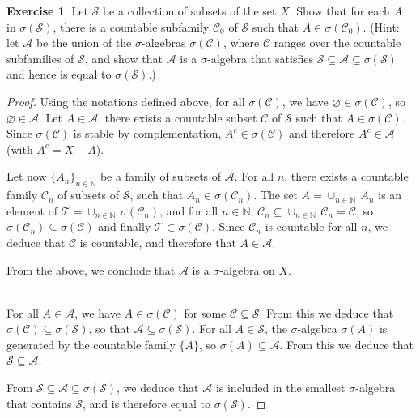 \documentclass[11pt,a4paper,twoside]{article}
\theoremstyle{definition}
\newcounter{excounter}
\newtheorem{exercise}[excounter]{Exercise}
\begin{document}
\begin{exercise}

  Let $\mathscr{S}$ be a collection of subsets of the set $X$. Show that for each $A$ in $\sigma ( \mathscr{S} )$,
  there is a countable subfamily $\mathscr{C}_0$ of $\mathscr{S}$ such that $A \in \sigma ( \mathscr{C}_0 )$. (Hint:
  let $\mathscr{A}$ be the union of the $\sigma$-algebras $\sigma ( \mathscr{C} )$, where $\mathscr{C}$ ranges over
  the countable subfamilies of $\mathscr{S}$, and show that $\mathscr{A}$ is a $\sigma$-algebra that satisfies
  $\mathscr{S} \subseteq \mathscr{A} \subseteq \sigma ( \mathscr{S} )$ and hence is equal to $\sigma ( \mathscr{S} )$.)

\end{exercise}

\begin{proof}

  Using the notations defined above, for all $\sigma ( \mathscr{C} )$, we have $\varnothing \in \sigma ( \mathscr{C} )$,
  so $\varnothing \in \mathscr{A}$. Let $A \in \mathscr{A}$, there exists a countable subset $\mathscr{C}$ of $\mathscr{S}$
  such that $A \in \sigma ( \mathscr{C} )$. Since $\sigma ( \mathscr{C} )$ is stable by complementation,
  $A^c \in \sigma ( \mathscr{C} )$ and therefore $A^c \in \mathscr{A}$ (with $A^c = X - A$).

  Let now $\{ A_n \}_{n \in \mathbb{N}}$ be a family of subsets of $\mathscr{A}$. For all $n$, there exists a countable
  family $\mathscr{C}_n$ of subsets of $\mathscr{S}$, such that $A_n \in \sigma ( \mathscr{C}_n )$. The set
  $A = \cup_{n \in \mathbb{N}} \,A_n$ is an element of $\mathscr{T} = \cup_{n \in \mathbb{N}} \,\sigma ( \mathscr{C}_n )$,
  and for all $n \in \mathbb{N}$, $\mathscr{C}_n \subseteq \cup_{n \in \mathbb{N}} \,\mathscr{C}_n = \mathscr{C}$,
  so $\sigma ( \mathscr{C}_n ) \subseteq \sigma ( \mathscr{C} )$ and finally $\mathscr{T} \subset \sigma ( \mathscr{C} )$.
  Since $\mathscr{C}_n$ is countable for all $n$, we deduce that $\mathscr{C}$ is countable, and therefore that $A \in \mathscr{A}$.

  From the above, we conclude that $\mathscr{A}$ is a $\sigma$-algebra on $X$.

  ~\\
  For all $A \in \mathscr{A}$, we have $A \in \sigma ( \mathscr{C} )$ for some $\mathscr{C} \subseteq \mathscr{S}$.
  From this we deduce that $\sigma ( \mathscr{C} ) \subseteq \sigma ( \mathscr{S} )$, so that $\mathscr{A} \subseteq \sigma ( \mathscr{S} )$.
  For all $A \in \mathscr{S}$, the $\sigma$-algebra $\sigma ( A )$ is generated by the countable family $\{ A \}$,
  so $\sigma ( A ) \subseteq \mathscr{A}$. From this we deduce that $\mathscr{S} \subseteq \mathscr{A}$.

  From $\mathscr{S} \subseteq \mathscr{A} \subseteq \sigma ( \mathscr{S} )$, we deduce that $\mathscr{A}$ is included
  in the smallest $\sigma$-algebra that contains $\mathscr{S}$, and is therefore equal to $\sigma ( \mathscr{S} )$.
  
\end{proof}
\end{document}
